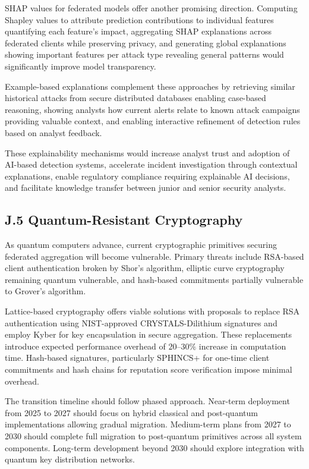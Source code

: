 \documentclass[12pt,a4paper]{article}
\theoremstyle{definition}
\begin{document}
SHAP values for federated models offer another promising direction. Computing Shapley values to attribute prediction contributions to individual features quantifying each feature's impact, aggregating SHAP explanations across federated clients while preserving privacy, and generating global explanations showing important features per attack type revealing general patterns would significantly improve model transparency.

Example-based explanations complement these approaches by retrieving similar historical attacks from secure distributed databases enabling case-based reasoning, showing analysts how current alerts relate to known attack campaigns providing valuable context, and enabling interactive refinement of detection rules based on analyst feedback.

These explainability mechanisms would increase analyst trust and adoption of AI-based detection systems, accelerate incident investigation through contextual explanations, enable regulatory compliance requiring explainable AI decisions, and facilitate knowledge transfer between junior and senior security analysts.

\subsection{J.5 Quantum-Resistant Cryptography}

As quantum computers advance, current cryptographic primitives securing federated aggregation will become vulnerable. Primary threats include RSA-based client authentication broken by Shor's algorithm, elliptic curve cryptography remaining quantum vulnerable, and hash-based commitments partially vulnerable to Grover's algorithm.

Lattice-based cryptography offers viable solutions with proposals to replace RSA authentication using NIST-approved CRYSTALS-Dilithium signatures and employ Kyber for key encapsulation in secure aggregation. These replacements introduce expected performance overhead of $20$--$30\%$ increase in computation time. Hash-based signatures, particularly SPHINCS+ for one-time client commitments and hash chains for reputation score verification impose minimal overhead.

The transition timeline should follow phased approach. Near-term deployment from 2025 to 2027 should focus on hybrid classical and post-quantum implementations allowing gradual migration. Medium-term plans from 2027 to 2030 should complete full migration to post-quantum primitives across all system components. Long-term development beyond 2030 should explore integration with quantum key distribution networks.
\end{document}
